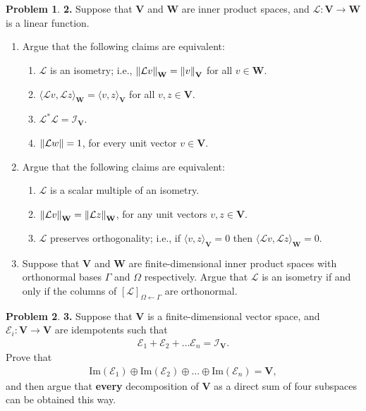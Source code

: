 \documentclass{book}
\theoremstyle{definition}
\newtheorem*{prob*}{Problem}
\newcommand{\V}{\mathbf{V}}
\newcommand{\W}{\mathbf{W}}
\newcommand{\lag}{\mathcal{L}}
\newcommand{\E}{\mathcal{E}}
\newcommand{\ima}{\text{Im}}
\newcommand{\la}{\langle}
\newcommand{\ra}{\rangle}
\begin{document}
\begin{prob*}\textbf{2.} Suppose that $\V$ and $\W$ are inner product spaces, and $\lag : \V \to \W$ is a linear function. 
	\begin{enumerate}
		\item Argue that the following claims are equivalent:
		\begin{enumerate}
			\item $\lag$ is an isometry; i.e., $\norm{\lag v}_\W = \norm{v}_\V$ for all $v\in \W$.
			\item $\la \lag v, \lag z \ra_\W = \la v,z \ra_\V$ for all $v,z\in \V$.
			\item $\lag^*\lag = \mathcal{I}_\V$.
			\item $\norm{\lag w} = 1$, for every unit vector $v\in \V$.
		\end{enumerate}
	
	
	
		\item Argue that the following claims are equivalent:
		\begin{enumerate}
			\item $\lag$ is a scalar multiple of an isometry. 
			\item $\norm{\lag v}_\W = \norm{\lag z}_\W$, for any unit vectors $v,z\in \V$.
			\item $\lag$ preserves orthogonality; i.e., if $\la v,z\ra_\V = 0$ then $\la \lag v, \lag z \ra_\W = 0$. 
		\end{enumerate}
	
	
		\item Suppose that $\V$ and $\W$ are finite-dimensional inner product spaces with orthonormal bases $\Gamma$ and $\Omega$ respectively. Argue that $\lag$ is an isometry if and only if the columns of $[\lag]_{\Omega \leftarrow \Gamma}$ are orthonormal. 
	\end{enumerate}
	
\end{prob*}






\newpage



\begin{prob*}\textbf{3.} Suppose that $\V$ is a finite-dimensional vector space, and $\E_i: \V \to \V$ are idempotents such that
	\begin{align*}
	\E_1 + \E_2 + \dots \E_n = \mathcal{I}_\V.
	\end{align*}
	Prove that 
	\begin{align*}
	\ima(\E_1) \oplus \ima(\E_2) \oplus \dots \oplus \ima(\E_n) = \V,
	\end{align*}
	and then argue that \textbf{every} decomposition of $\V$ as a direct sum of four subspaces can be obtained this way.
	
	
\end{prob*}
\end{document}
